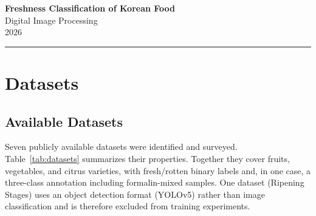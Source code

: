\documentclass[12pt, a4paper]{article}
\begin{document}
\begin{titlepage}
\centering
\vspace*{2.5cm}

{\LARGE\bfseries Freshness Classification of Korean Food}\\[3.5cm]

{\normalsize Digital Image Processing}\\[0.4em]
{\normalsize 2026}\\[3cm]

\hrule
\end{titlepage}

\tableofcontents
\newpage

\section{Datasets}

\subsection{Available Datasets}

Seven publicly available datasets were identified and surveyed.
Table~\ref{tab:datasets} summarizes their properties.
Together they cover fruits, vegetables, and citrus varieties, with fresh/rotten
binary labels and, in one case, a three-class annotation including formalin-mixed
samples.
One dataset (Ripening Stages) uses an object detection format (YOLOv5) rather
than image classification and is therefore excluded from training experiments.
\end{document}
